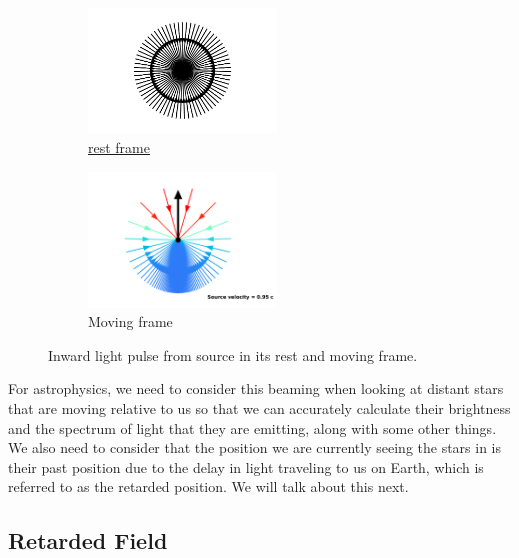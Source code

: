 \begin{figure}[H]
	\begin{subfigure}{.49\textwidth}
		\centering
		\includegraphics[width=5cm]{images/pdf/Rest_velocities_inwards.pdf}
		\caption{\hyperlink{def-proper-frame}{rest frame}}
	\end{subfigure}
	\begin{subfigure}{.49\textwidth}
		\centering
		\includegraphics[width=5cm]{images/pdf/Aberrated_velocities_inwards.pdf}
		\caption{Moving frame}
	\end{subfigure}
	\caption{Inward light pulse from source in its rest and moving frame.}
	\label{fig: Relativistic Beaming Recieved}
\end{figure}

For astrophysics, we need to consider this beaming when looking at distant stars that are moving relative to us so that we can accurately calculate their brightness and the spectrum of light that they are emitting, along with some other things.
We also need to consider that the position we are currently seeing the stars in is their past position due to the delay in light traveling to us on Earth, which is referred to as the retarded position.
We will talk about this next.

\subsection{Retarded Field}

